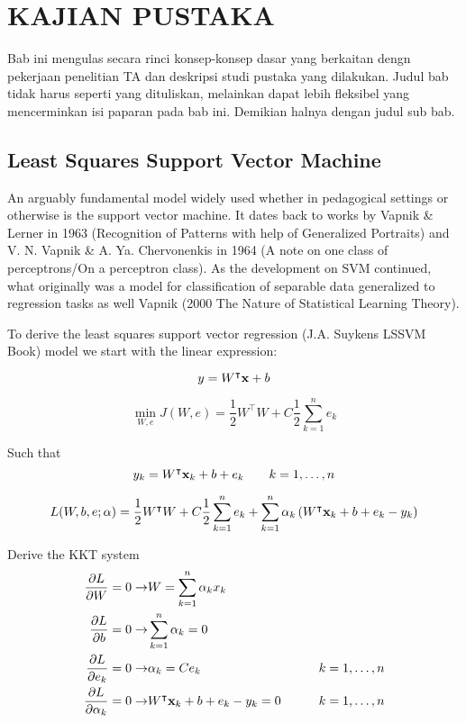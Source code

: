 \chapter{KAJIAN PUSTAKA}

\noindent Bab ini mengulas secara rinci konsep-konsep dasar yang berkaitan dengn pekerjaan penelitian TA dan deskripsi studi pustaka yang dilakukan. Judul bab tidak harus seperti yang dituliskan, melainkan dapat lebih fleksibel yang mencerminkan isi paparan pada bab ini. Demikian halnya dengan judul sub bab.

\section{Least Squares Support Vector Machine}
\noindent An arguably fundamental model widely used whether in pedagogical settings or otherwise is the support vector machine. It dates back to works by Vapnik \& Lerner in 1963 (Recognition of Patterns with help of Generalized Portraits) and V. N. Vapnik \& A. Ya. Chervonenkis in 1964 (A note on one class of perceptrons/On a perceptron class). As the development on SVM continued, what originally was a model for classification of separable data generalized to regression tasks as well Vapnik (2000 The Nature of Statistical Learning Theory).

To derive the least squares support vector regression (J.A. Suykens LSSVM Book) model we start with the linear expression:

\begin{equation}
        y=W^{\intercal}\vb{x}+b
\end{equation}

\begin{equation}
        \min_{W,e} J(W,e) = \frac{1}{2}W^{\intercal}W + C\frac{1}{2}\sum_{k=1}^{n}e_{k}
\end{equation}

Such that
\begin{equation}
        y_{k}=W^{\intercal}\vb{x}_{k}+b+e_{k} \qquad k=1,\dots,n
\end{equation}

\begin{equation}
        L(W,b,e;\vb{\alpha}) = \frac{1}{2}W^{\intercal}W + C\frac{1}{2}\sum_{k=1}^{n}e_{k} + \sum_{k=1}^{n}\alpha_{k} \left(W^{\intercal}\vb{x}_{k}+b+e_{k} - y_{k} \right)
\end{equation}

Derive the KKT system
\begin{equation}
        \begin{split}
                \pdv{L}{W} = 0 \rightarrow & W = \sum_{k=1}^{n}\alpha_{k}x_{k} \\
                \pdv{L}{b} = 0 \rightarrow & \sum_{k=1}^{n}\alpha_{k} = 0 \\
                \pdv{L}{e_{k}} = 0 \rightarrow & \alpha_{k} = C e_{k} & \qquad k=1,\dots,n\\
                \pdv{L}{\alpha_{k}} = 0 \rightarrow & W^{\intercal}\vb{x}_{k}+b+e_{k} - y_{k} = 0 & \qquad k=1,\dots,n\\
        \end{split}
\end{equation}

